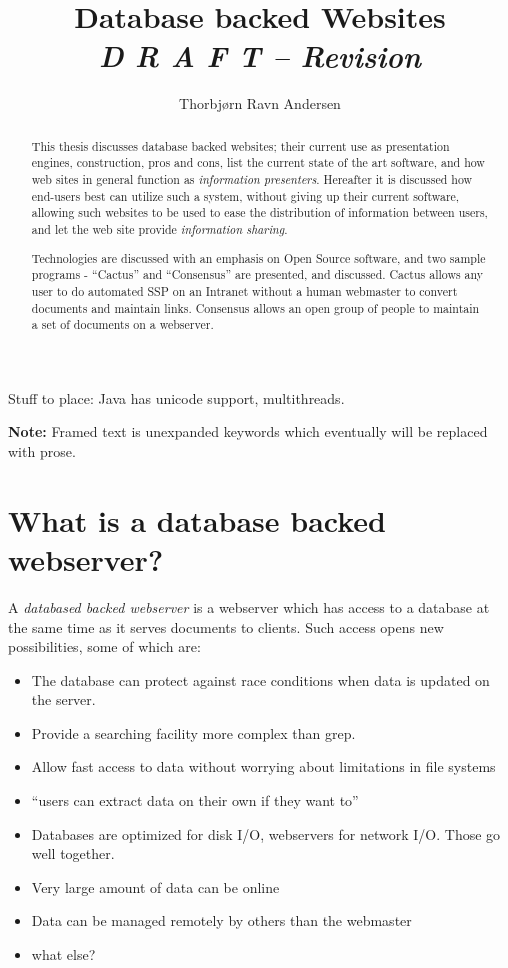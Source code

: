 \documentclass[ddraft,a4paper]{article}
\author{ Thorbj{\o}rn Ravn Andersen}
\title{Database backed Websites \\
  \textit{D R A F T -- $ $Revision$ $}} %
\begin{document}
\maketitle

\begin{abstract}
  This thesis discusses database backed websites; their current use as
  presentation engines, construction, pros and cons, list the current
  state of the art software, and how web sites in general function as
  \textit{information presenters}.  Hereafter it is discussed how
  end-users best can utilize such a system, without giving up their
  current software, allowing such websites to be used to ease the
  distribution of information between users, and let the web site
  provide \textit{information sharing}.
  
  Technologies are discussed with an emphasis on Open Source software,
  and two sample programs - ``Cactus'' and ``Consensus'' are
  presented,  and discussed.  Cactus allows any user to do automated
  SSP on an Intranet without a human webmaster to convert documents
  and maintain links.  Consensus allows an open group of people to
  maintain a set of documents on a webserver.
  
\end{abstract}

Stuff to place:  Java has unicode support, multithreads.


\textbf{Note: }Framed text is unexpanded keywords which eventually
will be replaced with prose.

\section{What is a database backed webserver?}

A \textit{databased backed webserver} is a webserver which has access
to a database at the same time as it serves documents to clients.
Such access opens new possibilities, some of which are:

\begin{itemize}
\item The database can protect against race conditions when data is
  updated on the server.
\item Provide a searching facility more complex than grep.
\item Allow fast access to data without worrying about limitations in
  file systems
\item ``\textsf{users can extract data on their own if they want to}''
\item Databases are optimized for disk I/O, webservers for network
  I/O.  Those go well together.
\item Very large amount of data can be online
\item Data can be managed remotely by others than the webmaster
\item \textsf{what else?}
\end{itemize}
\end{document}
